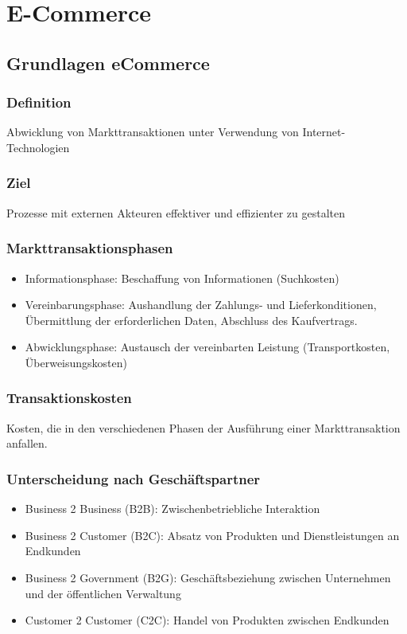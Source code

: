 \section{E-Commerce}

\subsection{Grundlagen eCommerce}
    \subsubsection*{Definition}
        Abwicklung von Markttransaktionen unter Verwendung von Internet-Technologien
    \subsubsection*{Ziel}
        Prozesse mit externen Akteuren effektiver und effizienter zu gestalten
    \subsubsection*{Markttransaktionsphasen}
        \begin{itemize}
            \item Informationsphase: Beschaffung von Informationen (Suchkosten)
            \item Vereinbarungsphase: Aushandlung der Zahlungs- und Lieferkonditionen, Übermittlung der erforderlichen Daten, Abschluss des Kaufvertrags.
            \item Abwicklungsphase: Austausch der vereinbarten Leistung (Transportkosten, Überweisungskosten)
        \end{itemize}
    \subsubsection*{Transaktionskosten}
        Kosten, die in den verschiedenen Phasen der Ausführung einer Markttransaktion anfallen.
    \subsubsection*{Unterscheidung nach Geschäftspartner} 
        \begin{itemize}
            \item Business 2 Business (B2B): Zwischenbetriebliche Interaktion
            \item Business 2 Customer (B2C): Absatz von Produkten und Dienstleistungen an Endkunden
            \item Business 2 Government (B2G): Geschäftsbeziehung zwischen Unternehmen und der öffentlichen Verwaltung
            \item Customer 2 Customer (C2C): Handel von Produkten zwischen Endkunden
        \end{itemize}


